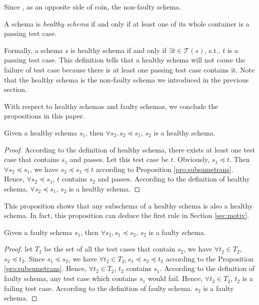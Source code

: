 Since , as an opposite side of coin, the non-faulty schema.
\begin{definition}\label{de:healthy}
A schema is \emph{healthy schema} if and only if at least one of its whole container is a passing test case.
\end{definition}

Formally, a schema $s$ is healthy schema if and only if $\exists t \in \mathcal{T}(s)$, s.t., $t$ is a passing test case. This definition tells that a healthy schema will not cause the failure of test case because there is at least one passing test case contains it. Note that the healthy schema is the non-faulty schema we introduced in the previous section.


With respect to healthy schemas and faulty schemas, we conclude the  propositions in this paper.

\begin{proposition}\label{pro:subofhealthy}
Given a healthy schema $s_{1}$, then $\forall s_{2}, s_{2} \preceq s_{1}$, $s_{2}$ is a healthy schema.
\end{proposition}

\begin{proof}
According to the definition of healthy schema,  there exists at least one test case that contains $s_{1}$ and passes. Let this test case be $t$. Obviously, $s_{1} \preceq t$.  Then $\forall s_{2} \preceq  s_{1}$, we have $s_{2} \preceq s_{1} \preceq t$ according to Proposition \ref{pro:subsumetrans}. Hence, $\forall s_{2} \preceq  s_{1}$,  $t$ contains $s_{2}$ and passes. According to the definition of healthy schema, $\forall s_{2} \preceq  s_{1}$, $s_{2}$ is a healthy schema.
\end{proof}

This proposition shows that any subschema of a healthy schema is also a healthy schema. In fact, this proposition can deduce the first rule in Section \ref{sec:motiv}.


\begin{proposition}\label{pro:superoffaulty}
Given a faulty schema $s_{1}$, then $\forall s_{2}, s_{1} \preceq s_{2}$, $s_{2}$ is a faulty schema.
\end{proposition}


\begin{proof}
let $T_{2}$ be the set of all the test cases that contain $s_{2}$, we have $\forall t_{2} \in T_{2}$, $s_{2} \preceq t_{2}$.  Since $s_{1} \preceq s_{2}$, we have $\forall t_{2} \in T_{2}, s_{1} \preceq s_{2} \preceq t_{2}$ according to the Proposition \ref{pro:subsumetrans}. Hence, $\forall t_{2} \in T_{2}$, $t_{2}$ contains $s_{1}$. According to the definition of faulty schema, any test case which contains $s_{1}$ would fail. Hence, $\forall t_{2} \in T_{2}$, $t_{2}$ is a failing test case. According to the definition of faulty schema. $s_{2}$ is a faulty schema.
\end{proof}

